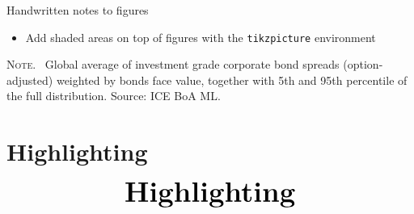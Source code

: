 \documentclass[10pt]{beamer}
\begin{document}
\begin{frame}[t]
	{Handwritten notes to figures}
	\begin{itemize}
		\item Add shaded areas on top of figures with the \texttt{tikzpicture} environment
	\end{itemize}
	\begin{center}
		\begin{minipage}[b]{.6\textwidth}
			\tiny{{\scshape Note}. \ Global average of investment grade corporate bond spreads (option-adjusted) weighted by bonds face value, together with 5th and 95th percentile of the full distribution. Source: ICE BoA ML.} 
		\end{minipage}
	\end{center}
\end{frame}	


\section{Highlighting}
\begin{frame}
	\begin{eqnarray*}
		&\text{{\Huge \textbf{Highlighting}}}\\
	\end{eqnarray*}
\end{frame}
\end{document}

